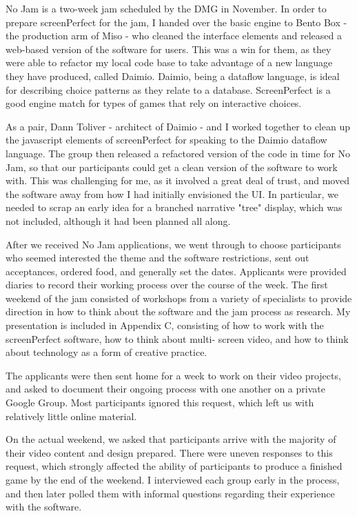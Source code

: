 No Jam is a two-week jam scheduled by the DMG in November. In order to prepare screenPerfect for the jam, I handed over the basic engine to Bento Box - the production arm of Miso - who cleaned the interface elements and released a web-based version of the software for users. This was a win for them, as they were able to refactor my local code base to take advantage of a new language they have produced, called Daimio. Daimio, being a dataflow language, is ideal for describing choice patterns as they relate to a database. ScreenPerfect is a good engine match for types of games that rely on interactive choices.

As a pair, Dann Toliver - architect of Daimio - and I worked together to clean up the javascript elements of screenPerfect for speaking to the Daimio dataflow language. The group then released a refactored version of the code in time for No Jam, so that our participants could get a clean version of the software to work with. This was challenging for me, as it involved a great deal of trust, and moved the software away from how I had initially envisioned the UI. In particular, we needed to scrap an early idea for a branched narrative "tree" display, which was not included, although it had been planned all along.

After we received No Jam applications, we went through to choose participants who seemed interested the theme and the software restrictions, sent out acceptances, ordered food, and generally set the dates. Applicants were provided diaries to record their working process over the course of the week. The first weekend of the jam consisted of workshops from a variety of specialists to provide direction in how to think about the software and the jam process as research. My presentation is included in Appendix C, consisting of how to work with the screenPerfect software, how to think about multi- screen video, and how to think about technology as a form of creative practice.

The applicants were then sent home for a week to work on their video projects, and asked to document their ongoing process with one another on a private Google Group. Most participants ignored this request, which left us with relatively little online material.

On the actual weekend, we asked that participants arrive with the majority of their video content and design prepared. There were uneven responses to this request, which strongly affected the ability of participants to produce a finished game by the end of the weekend. I interviewed each group early in the process, and then later polled them with informal questions regarding their experience with the software. 

